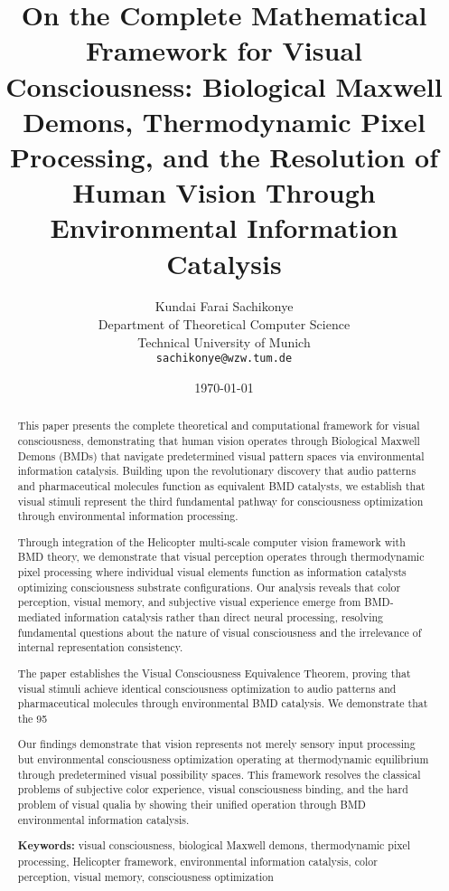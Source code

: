 \documentclass[12pt,a4paper]{article}
\title{On the Complete Mathematical Framework for Visual Consciousness: Biological Maxwell Demons, Thermodynamic Pixel Processing, and the Resolution of Human Vision Through Environmental Information Catalysis}
\author{Kundai Farai Sachikonye\\
Department of Theoretical Computer Science\\
Technical University of Munich\\
\texttt{sachikonye@wzw.tum.de}}
\date{\today}
\begin{document}
\maketitle

\begin{abstract}
This paper presents the complete theoretical and computational framework for visual consciousness, demonstrating that human vision operates through Biological Maxwell Demons (BMDs) that navigate predetermined visual pattern spaces via environmental information catalysis. Building upon the revolutionary discovery that audio patterns and pharmaceutical molecules function as equivalent BMD catalysts, we establish that visual stimuli represent the third fundamental pathway for consciousness optimization through environmental information processing.

Through integration of the Helicopter multi-scale computer vision framework with BMD theory, we demonstrate that visual perception operates through thermodynamic pixel processing where individual visual elements function as information catalysts optimizing consciousness substrate configurations. Our analysis reveals that color perception, visual memory, and subjective visual experience emerge from BMD-mediated information catalysis rather than direct neural processing, resolving fundamental questions about the nature of visual consciousness and the irrelevance of internal representation consistency.

The paper establishes the Visual Consciousness Equivalence Theorem, proving that visual stimuli achieve identical consciousness optimization to audio patterns and pharmaceutical molecules through environmental BMD catalysis. We demonstrate that the 95%

Our findings demonstrate that vision represents not merely sensory input processing but environmental consciousness optimization operating at thermodynamic equilibrium through predetermined visual possibility spaces. This framework resolves the classical problems of subjective color experience, visual consciousness binding, and the hard problem of visual qualia by showing their unified operation through BMD environmental information catalysis.

\textbf{Keywords:} visual consciousness, biological Maxwell demons, thermodynamic pixel processing, Helicopter framework, environmental information catalysis, color perception, visual memory, consciousness optimization
\end{abstract}
\end{document}
